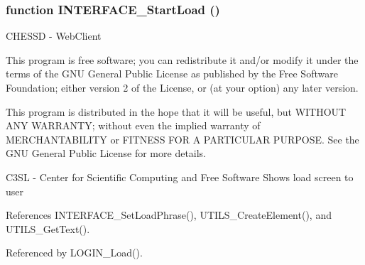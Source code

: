 \subsubsection{\setlength{\rightskip}{0pt plus 5cm}function INTERFACE\_\-StartLoad ()}\label{interface_2load_8js_a24aa832435532fae0fa3c9b2a8c1ac1}


CHESSD - WebClient

This program is free software; you can redistribute it and/or modify it under the terms of the GNU General Public License as published by the Free Software Foundation; either version 2 of the License, or (at your option) any later version.

This program is distributed in the hope that it will be useful, but WITHOUT ANY WARRANTY; without even the implied warranty of MERCHANTABILITY or FITNESS FOR A PARTICULAR PURPOSE. See the GNU General Public License for more details.

C3SL - Center for Scientific Computing and Free Software Shows load screen to user 

References INTERFACE\_\-SetLoadPhrase(), UTILS\_\-CreateElement(), and UTILS\_\-GetText().

Referenced by LOGIN\_\-Load().